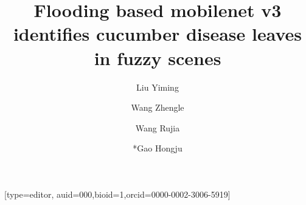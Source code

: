 \documentclass[a4paper,fleqn]{cas-sc}
\begin{document}
\let\WriteBookmarks\relax
\def\floatpagepagefraction{1}
\def\textpagefraction{.001}
\shorttitle{}

\title [mode=title]{Flooding based mobilenet v3 identifies cucumber disease leaves in fuzzy scenes}

\author[1]{Liu Yiming}[type=editor,
                        auid=000,bioid=1,orcid=0000-0002-3006-5919]

\author[2]{Wang Zhengle} 

\author[3]{Wang Rujia}

\author[2]{*Gao Hongju}

\address[1]{School of Computer Science(National Pilot Software Engineering School),Beijing University of Posts and Telecommunications,100876,China;liuyimingbyr@bupt.edu.cn}
\address[2]{College of Information and Electrical Engineering, China Agricultural University, Beijing 100083, China;wangzhengle@cau.edu.cn;hjgao@cau.edu.cn}
\address[3]{School of Information and Communication Engineering,School of Computer Science,Beijing University of Posts and Telecommunications,100876,China;WNHwrj@bupt.edu.cn}
\end{document}
